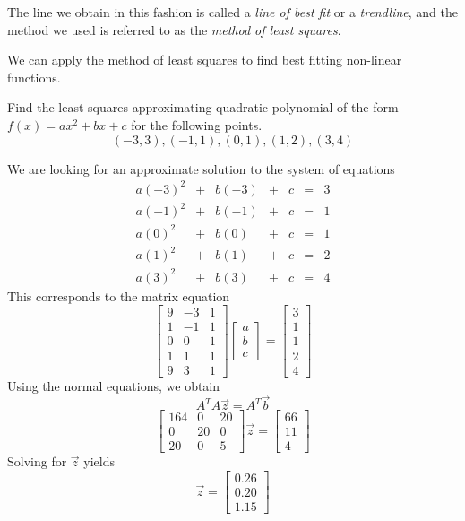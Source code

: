 \documentclass{ximera}
\begin{document}
 The line we obtain in this fashion is called a \emph{line of best fit} or a \emph{trendline}, and the method we used is referred to as the  \emph{method of least squares}.

 We can apply the method of least squares to find best fitting non-linear functions.  

 \begin{example}\label{ex:leastSquaresPoly}
Find the least squares approximating quadratic polynomial of the form $f(x)=ax^2+bx+c$ for the following points.
$$(-3, 3), (-1, 1), (0, 1), (1, 2), (3, 4)$$

\begin{explanation}
    We are looking for an approximate solution to the system of equations
    $$\begin{matrix}a(-3)^2&+&b(-3)&+&c&=&3\\a(-1)^2&+&b(-1)&+&c&=&1\\a(0)^2&+&b(0)&+&c&=&1\\a(1)^2&+&b(1)&+&c&=&2\\a(3)^2&+&b(3)&+&c&=&4\end{matrix}$$
    This corresponds to the matrix equation
    $$\begin{bmatrix}9&-3&1\\1&-1&1\\0&0&1\\1&1&1\\9&3&1\end{bmatrix}\begin{bmatrix}a\\b\\c\end{bmatrix}=\begin{bmatrix}3\\1\\1\\2\\4\end{bmatrix}$$
    Using the normal equations, we obtain
    $$A^TA\vec{z}=A^T\vec{b}$$
    $$\begin{bmatrix}164&0&20\\0&20&0\\20&0&5\end{bmatrix}\vec{z}=\begin{bmatrix}66\\11\\4\end{bmatrix}$$
    Solving for $\vec{z}$ yields
    $$\vec{z}=\begin{bmatrix}0.26\\0.20\\1.15\end{bmatrix}$$


\end{explanation}
\end{example}
\end{document}
